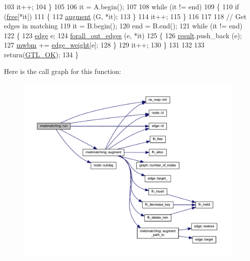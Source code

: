 \begin{DoxyCode}
103         it++;
104     \}
105     
106     it = A.begin();
107     
108     \textcolor{keywordflow}{while} (it != end)
109     \{
110         \textcolor{keywordflow}{if} (\mbox{\hyperlink{classmwbmatching_a109911f7997e2f1b3293e505deb4a4cb}{free}}[*it])
111         \{
112             \mbox{\hyperlink{classmwbmatching_adfb6ea829377c6ba08f6079d767d5a42}{augment}} (G, *it);
113         \}
114         it++;
115     \}
116 
117     
118     \textcolor{comment}{// Get edges in matching}
119     it = B.begin();
120     end = B.end();
121     \textcolor{keywordflow}{while} (it != end)
122     \{
123         \mbox{\hyperlink{classedge}{edge}} e;
124         \mbox{\hyperlink{node_8h_a5011d2a6e290aa0953ec5ff39fdec7c5}{forall\_out\_edges}} (e, *it)
125         \{
126             \mbox{\hyperlink{classmwbmatching_aa6483fb0f23c87f29bb08f7abff80144}{result}}.push\_back (e); 
127             \mbox{\hyperlink{classmwbmatching_a80e73b4ab7162ea265c48a93199fc172}{mwbm}} += \mbox{\hyperlink{classmwbmatching_a9624508c4944bffc6a349aa76ce6964c}{edge\_weight}}[e];
128         \}
129         it++;
130     \}
131 
132 
133     \textcolor{keywordflow}{return}(\mbox{\hyperlink{classalgorithm_af1a0078e153aa99c24f9bdf0d97f6710a5114c20e4a96a76b5de9f28bf15e282b}{GTL\_OK}});
134 \}
\end{DoxyCode}
Here is the call graph for this function\+:\nopagebreak
\begin{figure}[H]
\begin{center}
\leavevmode
\includegraphics[width=350pt]{classmwbmatching_adcb51caed21e77253940cd71bfd9a405_cgraph}
\end{center}
\end{figure}
